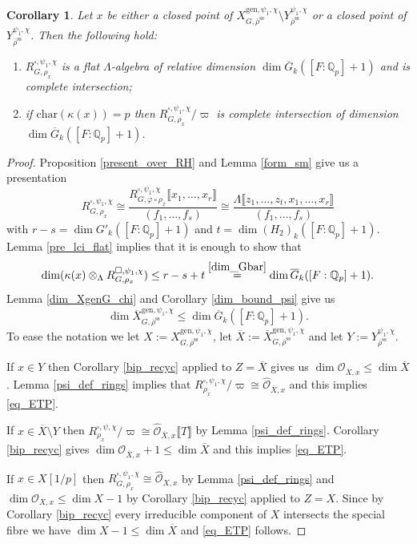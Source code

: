\documentclass{amsart}
\newtheorem{cor}[prop]{Corollary}
\theoremstyle{definition}
\theoremstyle{remark}
\newcommand{\Qp}{\mathbb {Q}_p}
\newcommand{\OO}{\mathcal O}
\newcommand{\br}[1]{\llbracket #1\rrbracket}
\newcommand{\rhobar}{\overline{\rho}}
\newcommand{\gen}{\mathrm{gen}}
\newcommand{\Xbar}{\overline{X}}
\newcommand{\chara}{\mathrm{char}}
\newcommand{\rhobarss}{\rhobar^{\mathrm{ss}}}
\newcommand{\Gbar}{\overline{G}}
\begin{document}
\begin{cor}\label{complete_intersection_chi}
Let $x$ be either a closed point of $X^{\gen,\psi_1, \chi}_{G, \rhobarss}\setminus Y_{\rhobarss}^{\psi_1, \chi}$ or  a closed point of $Y^{\psi_1, \chi}_{\rhobarss}$. Then the following hold:
\begin{enumerate}
\item $R^{\square,\psi_1, \chi}_{G, \rho_x}$ is a flat $\Lambda$-algebra of relative 
dimension $\dim \Gbar_k([F:\Qp]+1)$ and is complete intersection;
\item if $\chara(\kappa(x))=p$ then $R^{\square,\psi_1, \chi}_{G, \rho_x}/\varpi$ is complete 
intersection of dimension $\dim \Gbar_k([F:\Qp]+1)$.
\end{enumerate}
\end{cor}
\begin{proof} Proposition \ref{present_over_RH} and Lemma \ref{form_sm} give us a presentation 
\begin{equation}\label{represent_chi}
R^{\square,\psi_1, \chi}_{G, \rho_x}\cong \frac{R^{\square,\psi_1, \chi}_{G, \varphi\circ \rho_x}\br{x_1, \ldots, x_r}}{(f_1, \ldots, f_s)}\cong \frac{\Lambda\br{z_1, \ldots, z_t, x_1, \ldots, x_r}}{(f_1, \ldots, f_s)}
\end{equation}
    with  $r-s= \dim G'_k ([F:\Qp]+1)$ and $t=\dim (H_2)_k ([F:\Qp]+1)$. Lemma \ref{pre_lci_flat} implies that it is enough
to show that
\begin{equation}\label{eq_ETP}
\dim (\kappa(x)\otimes_{\Lambda}  R^{\square,\psi_1, \chi}_{G, \rho_x}) \le r-s +t \overset{\eqref{dim_Gbar}}{=} \dim \Gbar_k ([F:\Qp]+1).
\end{equation}
Lemma \ref{dim_XgenG_chi} and Corollary \ref{dim_bound_psi} give us 
\begin{equation}\label{bound_dim_psi_chi}
\dim \Xbar^{\gen, \psi_1, \chi}_{G, \rhobarss}\le \dim \Gbar_k ([F:\Qp]+1).
\end{equation}
To ease the notation we let $X:= X^{\gen,\psi_1,\chi}_{G, \rhobarss}$,  let $\Xbar:= \Xbar^{\gen,\psi_1,\chi}_{G, \rhobarss}$ and let 
$Y:=Y^{\psi_1, \chi}_{\rhobarss}$. 

If $x\in Y$ then Corollary \ref{bip_recyc} applied to $Z=\overline{X}$ gives us 
$\dim \OO_{\Xbar, x}\le \dim \Xbar$. Lemma \ref{psi_def_rings}
implies that $R^{\square,\psi_1,\chi}_{\rho_x}/\varpi\cong \hat{\OO}_{\Xbar,x}$ and this implies \eqref{eq_ETP}. 

If $x\in \Xbar\setminus Y$ then $R^{\square,\psi, \chi}_{\rho_x}/\varpi\cong \hat{\OO}_{\Xbar,x}\br{T}$
by Lemma \ref{psi_def_rings}. Corollary \ref{bip_recyc} gives
$\dim \OO_{\Xbar, x} +1 \le \dim \Xbar$ and this implies \eqref{eq_ETP}. 

If $x\in X[1/p]$ then $R^{\square,\psi_1, \chi}_{G, \rho_x}\cong \hat{\OO}_{X, x}$
by Lemma \ref{psi_def_rings} and $\dim \OO_{X, x} \le \dim X -1$ 
by Corollary \ref{bip_recyc} applied to $Z=X$. Since by Corollary \ref{bip_recyc}
every irreducible component of $X$ intersects the special fibre we have  
$\dim X -1 \le \dim \Xbar$ and \eqref{eq_ETP} follows.  
\end{proof} 
\end{document}
